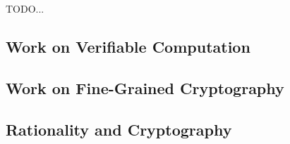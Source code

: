 TODO...

\subsection{Work on Verifiable Computation}


\subsection{Work on Fine-Grained Cryptography}

\subsection{Rationality and Cryptography}

